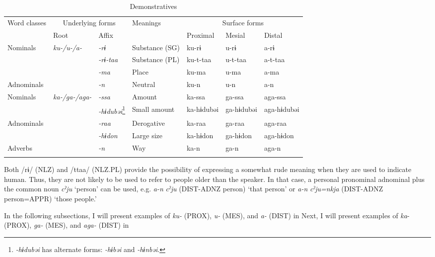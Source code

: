 \begin{sidewaystable}
\caption{\label{tab:key:37}Demonstratives}
\begin{tabular}{lllllll}
\lsptoprule
Word classes  &  \multicolumn{2}{c}{Underlying forms} & Meanings  &  \multicolumn{3}{c}{Surface forms}\\\cmidrule(lr){2-3}\cmidrule(lr){5-7}
              & Root & Affix & & Proximal & Mesial & Distal\\\midrule
Nominals      & \textit{ku-/u-/a-} & \textit{-rɨ}     & Substance (SG) &   ku-rɨ    & u-rɨ    & a-rɨ   \\
              &                    & \textit{-rɨ-taa} & Substance (PL) &   ku-t-taa & u-t-taa & a-t-taa\\
              &                    & \textit{-ma}     & Place          &   ku-ma    & u-ma    & a-ma   \\
Adnominals    &                    & \textit{-n}      & Neutral        &   ku-n     & u-n     & a-n    \\
Nominals      & \textit{ka-/ga-/aga-} & \textit{-ssa} & Amount         &   ka-ssa   & ga-ssa  & aga-ssa\\
              &                       & \textit{-hɨdubəi}\footnote{\textit{{}-hɨdubəi} has alternate forms: \textit{{}-hɨbəi} and \textit{{}-hɨnbəi}.} & Small amount    & ka-hɨdubəi  & ga-hɨdubəi & aga-hɨdubəi\\
Adnominals    &                       & \textit{-raa}     & Derogative   & ka-raa   & ga-raa    & aga-raa  \\
              &                       & \textit{-hɨdon}   & Large size   & ka-hɨdon & ga-hɨdon  & aga-hɨdon\\
Adverbs       &                       & \textit{-n}       & Way          & ka-n     & ga-n      & aga-n    \\
\lspbottomrule
\end{tabular}
\end{sidewaystable}

Both /rɨ/ (NLZ) and /ttaa/ (NLZ.PL) provide the possibility of expressing a somewhat rude meaning when they are used to indicate human. Thus, they are not likely to be used to refer to people older than the speaker. In that case, a personal pronominal adnominal plus the common noun \textit{cˀju} ‘person’ can be used, e.g. \textit{a-n} \textit{cˀju} (DIST-ADNZ person) ‘that person’ or \textit{a-n} \textit{cˀju=nkja} (DIST-ADNZ person=APPR) ‘those people.’

In the following subsections, I will present examples of \textit{ku-} (PROX), \textit{u-} (MES), and \textit{a-} (DIST) in  Next, I will present examples of \textit{ka}{}- (PROX), \textit{ga-} (MES), and \textit{aga-} (DIST) in 

